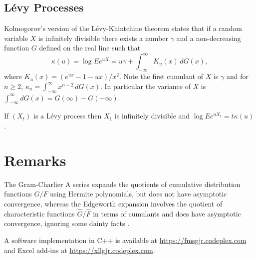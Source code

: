 \documentclass[11pt]{article}
\newcommand{\Var}{\mathop{\rm{Var}}}
\theoremstyle{remark}
\begin{document}
\subsection{L\'evy Processes}



Kolmogorov's version of the L\'evy-Khintchine theorem\cite{Kol1992}
states that if a random variable \(X\) is infinitely divisible
there exists a number \(\gamma\) and a non-decreasing function
\(G\) defined on the real line such that
\[
\kappa(u) = \log Ee^{uX} = u\gamma + \int_{-\infty}^\infty K_u(x)\,dG(x),
\]
where \(K_u(x) = (e^{ux} - 1 - ux)/x^2\). Note the first
cumulant of \(X\) is \(\gamma\) and for \(n\ge 2\),
\(\kappa_n = \int_{-\infty}^\infty x^{n-2}\,dG(x)\). In particular
the variance of \(X\) is 
\(\int_{-\infty}^\infty dG(x) = G(\infty) - G(-\infty)\).

If \((X_t)\) is a L\'evy process then \(X_1\) is
infinitely divisible and \(\log Ee^{uX_t} = t\kappa(u)\).

%

\section{Remarks}
The Gram-Charlier A series expands the quotients of cumulative
distribution functions \(G/F\) using Hermite polynomials, but does not
have asymptotic convergence, whereas the Edgeworth expansion involves
the quotient of characteristic functions \(\hat G/\hat F\) in terms of
cumulants and does have asymptotic convergence, ignoring some dainty
facts \cite{Pet1975}.

A software implementation in C++ is available at
\url{https://fmsgjr.codeplex.com} and Excel add-ins
at \url{https://xllgjr.codeplex.com}.



\end{document}
